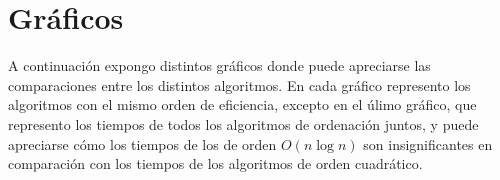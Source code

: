 \documentclass[a4]{article}
\begin{document}
    \section{Gráficos}
    \setcounter{subfigure}{0}

    \begin{flushleft}
      A continuación expongo distintos gráficos donde puede apreciarse
      las comparaciones entre los distintos algoritmos. En cada
      gráfico represento los algoritmos con el mismo orden de
      eficiencia, excepto en el úlimo gráfico, que represento los
      tiempos de todos los algoritmos de ordenación juntos, y puede
      apreciarse cómo los tiempos de los de orden $O(n\log n)$ son
      insignificantes en comparación con los tiempos de los algoritmos
      de orden cuadrático.
    \end{flushleft}
\end{document}
